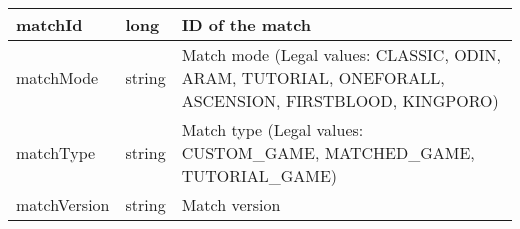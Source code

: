 \begin{table}[!htb]
\begin{tabular}{|llp{5cm}|}
matchId               & long                          & ID of the match                                                                                                                                                                                                                                                                                                                                                                                                                                                                                                                                                                                                                         \\ \hline
matchMode             & string                        & Match mode (Legal values: CLASSIC, ODIN, ARAM, TUTORIAL, ONEFORALL, ASCENSION, FIRSTBLOOD, KINGPORO)                                                                                                                                                                                                                                                                                                                                                                                                                                                                                                                                    \\ \hline
matchType             & string                        & Match type (Legal values: CUSTOM\_GAME, MATCHED\_GAME, TUTORIAL\_GAME)                                                                                                                                                                                                                                                                                                                                                                                                                                                                                                                                                                  \\ \hline
matchVersion          & string                        & Match version                                                                                                                                                                                                                                                                                                                                                                                                                                                                                                                                                                                                                           \\ \hline

\end{tabular}
\end{table}
